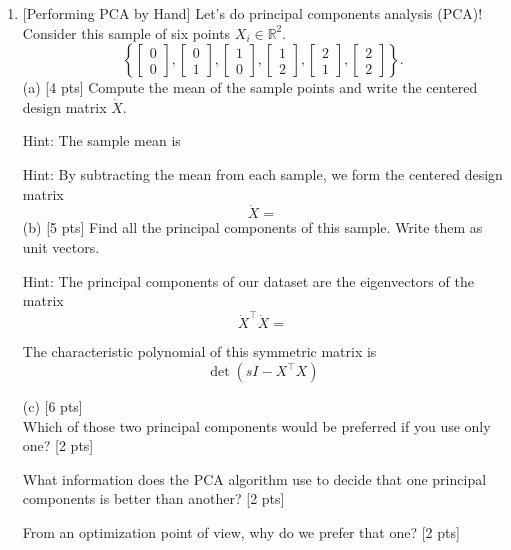 \documentclass[10pt]{article}
\begin{document}
\begin{enumerate}[1.]
 









\newpage
 \item {} [Performing PCA by Hand]
 Let's do principal components analysis (PCA)! Consider this sample of six points $X_i \in \mathbb{R}^2$.
$$
\left\{\left[\begin{array}{l}
0 \\
0
\end{array}\right],\left[\begin{array}{l}
0 \\
1
\end{array}\right],\left[\begin{array}{l}
1 \\
0
\end{array}\right],\left[\begin{array}{l}
1 \\
2
\end{array}\right],\left[\begin{array}{l}
2 \\
1
\end{array}\right],\left[\begin{array}{l}
2 \\
2
\end{array}\right]\right\} .
$$
(a) [4 pts] Compute the mean of the sample points and write the centered design matrix $\dot{X}$.

Hint: The sample mean is


Hint: By subtracting the mean from each sample, we form the centered design matrix
$$
\dot{X}=
$$
(b) [5 pts] Find all the principal components of this sample. Write them as unit vectors.

Hint: The principal components of our dataset are the eigenvectors of the matrix
$$
\dot{X}^{\top} \dot{X}=
$$

The characteristic polynomial of this symmetric matrix is
$$
\operatorname{det}\left(s I-X^{\top} X\right)
$$

(c) [6 pts]\\
Which of those two principal components would be preferred if you use only one? [2 pts]\par
What information does the PCA algorithm use to decide that one principal components is better than another? [2 pts]\par
From an optimization point of view, why do we prefer that one? [2 pts]\par


\end{enumerate}
\end{document}
